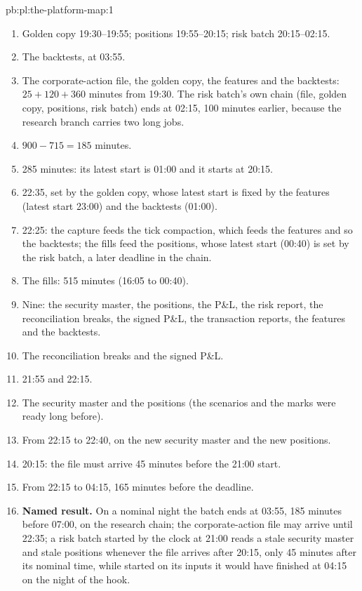 \begin{solution}{pb:pl:the-platform-map:1}
\begin{enumerate}
\item Golden copy 19:30--19:55; positions 19:55--20:15; risk batch 20:15--02:15.
\item The backtests, at 03:55.
\item The corporate-action file, the golden copy, the features and the backtests: $25 + 120 + 360$ minutes from 19:30. The risk
batch's own chain (file, golden copy, positions, risk batch) ends at 02:15, 100 minutes earlier, because the research branch
carries two long jobs.
\item $900 - 715 = 185$ minutes.
\item 285 minutes: its latest start is 01:00 and it starts at 20:15.
\item 22:35, set by the golden copy, whose latest start is fixed by the features (latest start 23:00) and the backtests (01:00).
\item 22:25: the capture feeds the tick compaction, which feeds the features and so the backtests; the fills feed the positions,
whose latest start (00:40) is set by the risk batch, a later deadline in the chain.
\item The fills: 515 minutes (16:05 to 00:40).
\item Nine: the security master, the positions, the P\&L, the risk report, the reconciliation breaks, the signed P\&L, the
transaction reports, the features and the backtests.
\item The reconciliation breaks and the signed P\&L.
\item 21:55 and 22:15.
\item The security master and the positions (the scenarios and the marks were ready long before).
\item From 22:15 to 22:40, on the new security master and the new positions.
\item 20:15: the file must arrive 45 minutes before the 21:00 start.
\item From 22:15 to 04:15, 165 minutes before the deadline.
\item \textbf{Named result.} On a nominal night the batch ends at 03:55, 185 minutes before 07:00, on the research chain; the
corporate-action file may arrive until 22:35; a risk batch started by the clock at 21:00 reads a stale security master and stale
positions whenever the file arrives after 20:15, only 45 minutes after its nominal time, while started on its inputs it would
have finished at 04:15 on the night of the hook.

\end{enumerate}
\end{solution}
